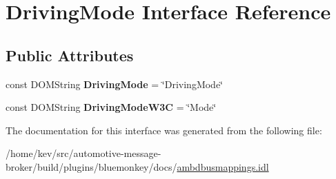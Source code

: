 \hypertarget{interfaceDrivingMode}{\section{Driving\+Mode Interface Reference}
\label{interfaceDrivingMode}
}
\subsection*{Public Attributes}
\begin{DoxyCompactItemize}
\item 
\hypertarget{interfaceDrivingMode_a24f15f8a246ed0a61ad08ea4f6128865}{const D\+O\+M\+String {\bfseries Driving\+Mode} = \char`\"{}Driving\+Mode\char`\"{}}\label{interfaceDrivingMode_a24f15f8a246ed0a61ad08ea4f6128865}

\item 
\hypertarget{interfaceDrivingMode_a9f051930937ada5b864954ad306a6506}{const D\+O\+M\+String {\bfseries Driving\+Mode\+W3\+C} = \char`\"{}Mode\char`\"{}}\label{interfaceDrivingMode_a9f051930937ada5b864954ad306a6506}

\end{DoxyCompactItemize}


The documentation for this interface was generated from the following file\+:\begin{DoxyCompactItemize}
\item 
/home/kev/src/automotive-\/message-\/broker/build/plugins/bluemonkey/docs/\hyperlink{ambdbusmappings_8idl}{ambdbusmappings.\+idl}\end{DoxyCompactItemize}
